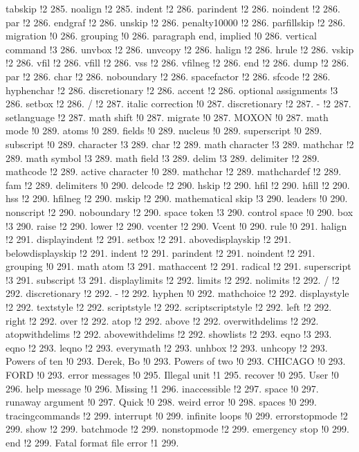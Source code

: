 tabskip !2 285.
noalign !2 285.
indent !2 286.
parindent !2 286.
noindent !2 286.
par !2 286.
endgraf !2 286.
unskip !2 286.
penalty10000 !2 286.
parfillskip !2 286.
migration !0 286.
grouping !0 286.
paragraph end, implied !0 286.
vertical command !3 286.
unvbox !2 286.
unvcopy !2 286.
halign !2 286.
hrule !2 286.
vskip !2 286.
vfil !2 286.
vfill !2 286.
vss !2 286.
vfilneg !2 286.
end !2 286.
dump !2 286.
par !2 286.
char !2 286.
noboundary !2 286.
spacefactor !2 286.
sfcode !2 286.
hyphenchar !2 286.
discretionary !2 286.
accent !2 286.
optional assignments !3 286.
setbox !2 286.
/ !2 287.
italic correction !0 287.
discretionary !2 287.
- !2 287.
setlanguage !2 287.
math shift !0 287.
migrate !0 287.
MOXON !0 287.
math mode !0 289.
atoms !0 289.
fields !0 289.
nucleus !0 289.
superscript !0 289.
subscript !0 289.
character !3 289.
char !2 289.
math character !3 289.
mathchar !2 289.
math symbol !3 289.
math field !3 289.
delim !3 289.
delimiter !2 289.
mathcode !2 289.
active character !0 289.
mathchar !2 289.
mathchardef !2 289.
fam !2 289.
delimiters !0 290.
delcode !2 290.
hskip !2 290.
hfil !2 290.
hfill !2 290.
hss !2 290.
hfilneg !2 290.
mskip !2 290.
mathematical skip !3 290.
leaders !0 290.
nonscript !2 290.
noboundary !2 290.
space token !3 290.
control space !0 290.
box !3 290.
raise !2 290.
lower !2 290.
vcenter !2 290.
Vcent !0 290.
rule !0 291.
halign !2 291.
displayindent !2 291.
setbox !2 291.
abovedisplayskip !2 291.
belowdisplayskip !2 291.
indent !2 291.
parindent !2 291.
noindent !2 291.
grouping !0 291.
math atom !3 291.
mathaccent !2 291.
radical !2 291.
superscript !3 291.
subscript !3 291.
displaylimits !2 292.
limits !2 292.
nolimits !2 292.
/ !2 292.
discretionary !2 292.
- !2 292.
hyphen !0 292.
mathchoice !2 292.
displaystyle !2 292.
textstyle !2 292.
scriptstyle !2 292.
scriptscriptstyle !2 292.
left !2 292.
right !2 292.
over !2 292.
atop !2 292.
above !2 292.
overwithdelims !2 292.
atopwithdelims !2 292.
abovewithdelims !2 292.
showlists !2 293.
eqno !3 293.
eqno !2 293.
leqno !2 293.
everymath !2 293.
unhbox !2 293.
unhcopy !2 293.
Powers of ten !0 293.
Derek, Bo !0 293.
Powers of two !0 293.
CHICAGO !0 293.
FORD !0 293.
error messages !0 295.
Illegal unit !1 295.
recover !0 295.
User !0 296.
help message !0 296.
Missing !1 296.
inaccessible !2 297.
space !0 297.
runaway argument !0 297.
Quick !0 298.
weird error !0 298.
spaces !0 299.
tracingcommands !2 299.
interrupt !0 299.
infinite loops !0 299.
errorstopmode !2 299.
show !2 299.
batchmode !2 299.
nonstopmode !2 299.
emergency stop !0 299.
end !2 299.
Fatal format file error !1 299.
